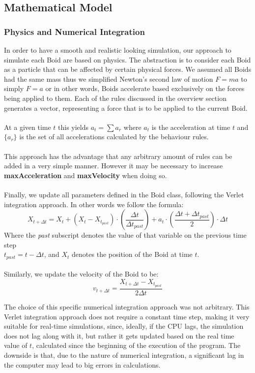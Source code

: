 \documentclass[12pt]{article}
\begin{document}
\subsection{Mathematical Model}
\subsubsection{Physics and Numerical Integration}
In order to have a smooth and realistic looking simulation, our approach to simulate each Boid are based on physics. The abstraction is to consider each Boid as a particle that can be affected by certain physical forces. We assumed all Boids had the same mass thus we simplified Newton's second law of motion $F=ma$ to simply $F=a$ or in other words, Boids accelerate based exclusively on the forces being applied to them. Each of the rules discussed in the overview section generates a vector, representing a force that is to be applied to the current Boid. 
\\ \\
At a given time $t$ this yields $a_t = \sum a_r$ where $a_t$ is the acceleration at time $t$ and $\{a_r\}$ is the set of all accelerations calculated by the behaviour rules. 
\\ \\
This approach has the advantage that any arbitrary amount of rules can be added in a very simple manner. However it may be necessary to increase \textbf{maxAcceleration} and \textbf{maxVelocity} when doing so.
\\ \\
Finally, we update all parameters defined in the Boid class, following the Verlet integration approach. In other words we follow the formula:
$$X_{t+\Delta t} = X_t + (X_t-X_{t_{past}})\cdot(\frac{\Delta t}{\Delta t_{past}}) + a_t\cdot(\frac{\Delta t + \Delta t_{past}}{2})\cdot\Delta t$$
Where the \textit{past} subscript denotes the value of that variable on the previous time step\\
$t_{past}=t-\Delta t$, and $X_t$ denotes the position of the Boid at time $t$.
\\ \\
Similarly, we update the velocity of the Boid to be: 
$$v_{t+\Delta t} = \frac{X_{t+\Delta t} - X_{t_{past}}}{2\Delta t}$$

The choice of this specific numerical integration approach was not arbitrary. This Verlet integration approach does not require a constant time step, making it very suitable for real-time simulations, since, ideally, if the CPU lags, the simulation does not lag along with it, but rather it gets updated based on the real time value of $t$, calculated since the beginning of the execution of the program. The downside is that, due to the nature of numerical integration, a significant lag in the computer may lead to big errors in calculations.
\end{document}
